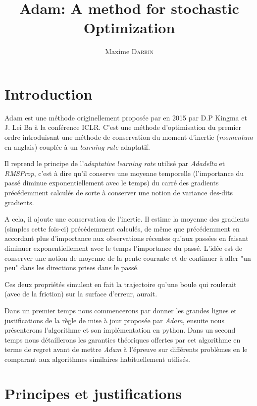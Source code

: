 \documentclass[fleqn,11pt, titlepage, french]{article}
\title{Adam: A method for stochastic Optimization}
\author{Maxime \textsc{Darrin}}
\begin{document}
	\maketitle
	\tableofcontents

	\newpage
	
	\section{Introduction}
	
	Adam est une méthode originellement proposée par en 2015 par D.P Kingma et J. Lei Ba à la conférence ICLR. C'est une méthode d'optimisation du premier ordre introduisant une méthode de conservation du moment d'inertie (\emph{momentum} en anglais) couplée à un \emph{learning rate} adaptatif.
	
	Il reprend le principe de l'\emph{adaptative learning rate} utilisé par \emph{Adadelta\cite{adadelta}} et \emph{RMSProp\cite{rmsprop}}, c'est à dire qu'il conserve une moyenne temporelle (l'importance du passé diminue exponentiellement avec le temps) du carré des gradients précédemment calculés de sorte à conserver une notion de variance des-dits gradients.
		
	A cela, il ajoute une conservation de l'inertie. Il estime la moyenne des gradients (simples cette fois-ci) précédemment calculés, de même que précédemment en accordant plus d'importance aux observations récentes qu'aux passées en faisant diminuer exponentiellement avec le temps l'importance du passé. L'idée est de conserver une notion de moyenne de la pente courante et de continuer à aller "un peu" dans les directions prises dans le passé.
	
	Ces deux propriétés simulent en fait la trajectoire qu'une boule qui roulerait (avec de la friction) sur la surface d'erreur, aurait.
	
	Dans un premier temps nous commencerons par donner les grandes lignes et justifications de la règle de mise à jour proposée par \emph{Adam}, ensuite nous présenterons l'algorithme et son implémentation en python. Dans un second temps nous détaillerons les garanties théoriques offertes par cet algorithme en terme de regret avant de mettre \emph{Adam} à l'épreuve sur différents problèmes en le comparant aux algorithmes similaires habituellement utilisés.
	
	
	\section{Principes et justifications}
	
\end{document}

